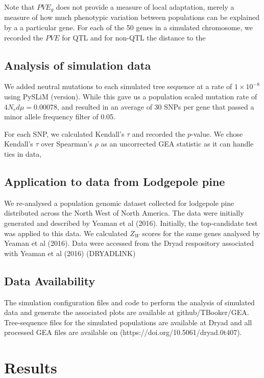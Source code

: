 \documentclass[11pt,twoside,lineno]{GSA_format}
\begin{document}
Note that $PVE_g$ does not provide a measure of local adaptation, merely a measure of how much phenotypic variation between populations can be explained by a a particular gene. 
For each of the 50 genes in a simulated chromosome, we recorded the $PVE$ for QTL and for non-QTL the distance to the 

\subsection{Analysis of simulation data}

We added neutral mutations to each simulated tree sequence at a rate of $1\times10^{-8}$ using PySLiM (version). While this gave us a population scaled mutation rate of $4N_ed\mu = 0.00078$, and resulted in an average of 30 SNPs per gene that passed a minor allele frequency filter of 0.05.

For each SNP, we calculated Kendall's $\tau$ and recorded the $p$-value. We chose Kendall's $\tau$ over Spearman's $\rho$ as an uncorrected GEA statistic as it can handle ties in data, 


\subsection{Application to data from Lodgepole pine}

We re-analysed a population genomic dataset collected for lodgepole pine distributed across the North West of North America. The data were initially generated and described by Yeaman et al (2016). Initially, the top-candidate test was applied to this data. We calculated $Z_W$ scores for the same genes analysed by Yeaman et al (2016). Data were accessed from the Dryad respository associated with Yeaman et al (2016) (DRYADLINK)

\subsection{Data Availability}

The simulation configuration files and code to perform the analysis of simulated data and generate the associated plots are available at github/TBooker/GEA. Tree-sequence files for the simulated populations are available at Dryad and all processed GEA files are available on (https://doi.org/10.5061/dryad.0t407). 


\section{Results}
\end{document}
